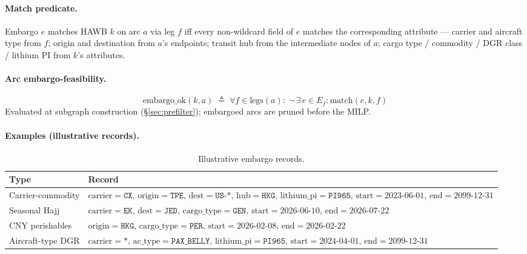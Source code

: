 \documentclass[11pt,a4paper]{article}
\newcommand{\defeq}{\triangleq}
\theoremstyle{definition}
\begin{document}
\paragraph{Match predicate.}
Embargo $e$ matches HAWB $k$ on arc $a$ via leg $f$ iff every non-wildcard
field of $e$ matches the corresponding attribute --- carrier and aircraft type
from $f$; origin and destination from $a$'s endpoints; transit hub from the
intermediate nodes of $a$; cargo type / commodity / DGR class / lithium PI
from $k$'s attributes.

\paragraph{Arc embargo-feasibility.}
\begin{equation}
  \text{embargo\_ok}(k, a) \;\defeq\;
    \forall f \in \text{legs}(a):\;
    \neg \, \exists\, e \in E_f : \text{match}(e, k, f)
  \label{eq:embargo-feasibility}
\end{equation}
Evaluated at subgraph construction (\S\ref{sec:prefilter}); embargoed arcs are
pruned before the MILP.

\paragraph{Examples (illustrative records).}
\begin{table}[H]
\centering
\caption{Illustrative embargo records.}
\label{tab:embargo-examples}
\begin{tabular}{lp{10.5cm}}
\toprule
Type & Record \\
\midrule
Carrier-commodity & $\text{carrier} = \texttt{CX},\, \text{origin} = \texttt{TPE},\,
                    \text{dest} = \texttt{US-*},\, \text{hub} = \texttt{HKG},\,
                    \text{lithium\_pi} = \texttt{PI965},\,
                    \text{start} = 2023\text{-}06\text{-}01,\,
                    \text{end} = 2099\text{-}12\text{-}31$ \\
Seasonal Hajj & $\text{carrier} = \texttt{EK},\, \text{dest} = \texttt{JED},\,
                 \text{cargo\_type} = \texttt{GEN},\,
                 \text{start} = 2026\text{-}06\text{-}10,\,
                 \text{end} = 2026\text{-}07\text{-}22$ \\
CNY perishables & $\text{origin} = \texttt{HKG},\, \text{cargo\_type} = \texttt{PER},\,
                   \text{start} = 2026\text{-}02\text{-}08,\,
                   \text{end} = 2026\text{-}02\text{-}22$ \\
Aircraft-type DGR & $\text{carrier} = \texttt{*},\, \text{ac\_type} = \texttt{PAX\_BELLY},\,
                    \text{lithium\_pi} = \texttt{PI965},\,
                    \text{start} = 2024\text{-}04\text{-}01,\,
                    \text{end} = 2099\text{-}12\text{-}31$ \\
\bottomrule
\end{tabular}
\end{table}
\end{document}
